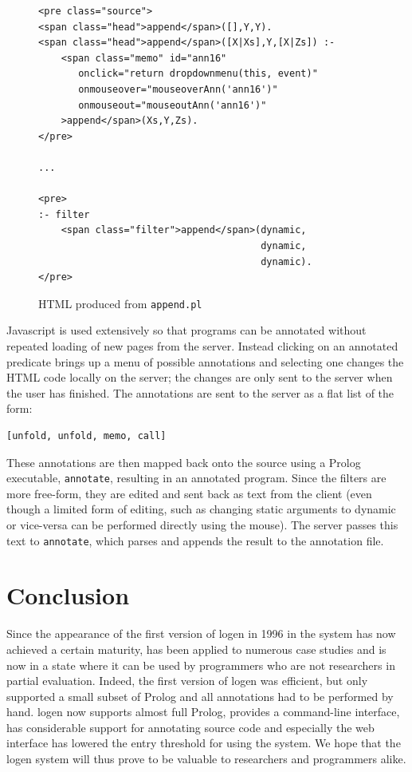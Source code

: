 \documentclass{sig-alternate}
\begin{document}
\begin{figure}[htb]
\begin{verbatim}
<pre class="source">
<span class="head">append</span>([],Y,Y).
<span class="head">append</span>([X|Xs],Y,[X|Zs]) :-
    <span class="memo" id="ann16"
       onclick="return dropdownmenu(this, event)"
       onmouseover="mouseoverAnn('ann16')"
       onmouseout="mouseoutAnn('ann16')"
    >append</span>(Xs,Y,Zs).
</pre>

...

<pre>
:- filter
    <span class="filter">append</span>(dynamic,
                                       dynamic,
                                       dynamic).
</pre>
\end{verbatim}
\caption{HTML produced from \texttt{append.pl}}
\protect\label{figure:append_html}
\end{figure}
Javascript is used extensively so that programs can be annotated without
repeated loading of new pages from the server. Instead clicking on an annotated
predicate brings up a menu of possible annotations and selecting one changes the
HTML code locally on the server; the changes are only sent to the server when the
user has finished. The annotations are sent to the server as a flat list of the 
form:
\begin{verbatim}
[unfold, unfold, memo, call]
\end{verbatim}

These annotations are then mapped back onto the source using a Prolog
executable, \texttt{annotate}, resulting in an annotated program. Since the
filters are more free-form, they are edited and sent back as text from the
client (even though a limited form of editing, such as changing static arguments to dynamic or vice-versa
 can be performed directly using the mouse).
 The server passes this text to \texttt{annotate}, which parses and
appends the result to the annotation file.

\section{Conclusion}


Since  the appearance of the
   first version of {\sc logen} in 1996 in \cite{JorgensenLeuschel:Cogen}
  the system has now achieved a certain maturity, has been applied
  to numerous case studies and is now in a state where it can be used
  by programmers who are not researchers in partial evaluation.
Indeed, the first version of {\sc logen} was efficient, but
 only supported a small subset of
 Prolog and all annotations had to be performed by hand.
{\sc logen} now supports almost full Prolog, provides a command-line
 interface, has considerable support
for annotating source code
and especially the web interface has lowered the entry threshold for
 using the system.
We hope that the {\sc logen} system will thus prove to be valuable
 to researchers and programmers alike.
\end{document}
